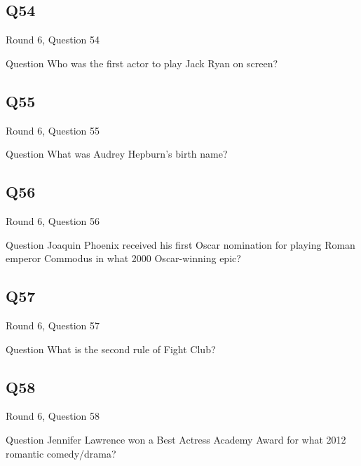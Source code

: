\documentclass[11pt]{beamer}
\begin{document}
\subsection*{Q54}
\begin{frame}[t]{Round 6, Question 54}
\vspace{2em}
\begin{block}{Question}
Who was the first actor to play Jack Ryan on screen?
\end{block}
\end{frame}
    

\subsection*{Q55}
\begin{frame}[t]{Round 6, Question 55}
\vspace{2em}
\begin{block}{Question}
What was Audrey Hepburn's birth name?
\end{block}
\end{frame}
    

\subsection*{Q56}
\begin{frame}[t]{Round 6, Question 56}
\vspace{2em}
\begin{block}{Question}
Joaquin Phoenix received his first Oscar nomination for playing Roman emperor Commodus in what 2000 Oscar-winning epic?
\end{block}
\end{frame}
    

\subsection*{Q57}
\begin{frame}[t]{Round 6, Question 57}
\vspace{2em}
\begin{block}{Question}
What is the second rule of Fight Club?
\end{block}
\end{frame}
    

\subsection*{Q58}
\begin{frame}[t]{Round 6, Question 58}
\vspace{2em}
\begin{block}{Question}
Jennifer Lawrence won a Best Actress Academy Award for what 2012 romantic comedy/drama?
\end{block}
\end{frame}
    
\end{document}
